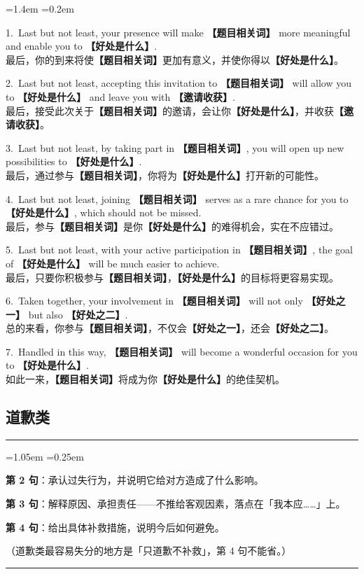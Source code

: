 \documentclass[11pt,a4paper]{ctexart}
\newcommand{\fillin}[1]{{\bfseries【#1】}}
\newenvironment{tpl}[1]{%
  \par\addvspace{7pt}\needspace{4\baselineskip}%
  \noindent{\bfseries\color{accent}#1}\par\nopagebreak
  \vspace{2pt}\noindent\rule{\linewidth}{0.7pt}\par\nopagebreak\vspace{3pt}%
  \begin{list}{}{\leftmargin=1.05em \rightmargin=0.25em \listparindent=0pt
    \itemindent=0pt \topsep=0pt \parsep=2.5pt \itemsep=2.5pt \partopsep=0pt}%
  \item\relax
}{%
  \end{list}\vspace{1pt}\noindent\rule{\linewidth}{0.7pt}\par\addvspace{8pt}%
}
\newenvironment{eg}{%
  \par\addvspace{4pt}%
  \begin{list}{}{\leftmargin=1.4em \rightmargin=0.2em \listparindent=0pt
    \itemindent=0pt \topsep=0pt \parsep=2pt \itemsep=2pt \partopsep=0pt}%
  \item\relax
}{%
  \end{list}\addvspace{5pt}%
}
\begin{document}
\begin{eg}
1.\ Last but not least, your presence will make \fillin{题目相关词} more meaningful and enable you to \fillin{好处是什么}.\\
最后，你的到来将使\fillin{题目相关词}更加有意义，并使你得以\fillin{好处是什么}。

2.\ Last but not least, accepting this invitation to \fillin{题目相关词} will allow you to \fillin{好处是什么} and leave you with \fillin{邀请收获}.\\
最后，接受此次关于\fillin{题目相关词}的邀请，会让你\fillin{好处是什么}，并收获\fillin{邀请收获}。

3.\ Last but not least, by taking part in \fillin{题目相关词}, you will open up new possibilities to \fillin{好处是什么}.\\
最后，通过参与\fillin{题目相关词}，你将为\fillin{好处是什么}打开新的可能性。

4.\ Last but not least, joining \fillin{题目相关词} serves as a rare chance for you to \fillin{好处是什么}, which should not be missed.\\
最后，参与\fillin{题目相关词}是你\fillin{好处是什么}的难得机会，实在不应错过。

5.\ Last but not least, with your active participation in \fillin{题目相关词}, the goal of \fillin{好处是什么} will be much easier to achieve.\\
最后，只要你积极参与\fillin{题目相关词}，\fillin{好处是什么}的目标将更容易实现。

6.\ Taken together, your involvement in \fillin{题目相关词} will not only \fillin{好处之一} but also \fillin{好处之二}.\\
总的来看，你参与\fillin{题目相关词}，不仅会\fillin{好处之一}，还会\fillin{好处之二}。

7.\ Handled in this way, \fillin{题目相关词} will become a wonderful occasion for you to \fillin{好处是什么}.\\
如此一来，\fillin{题目相关词}将成为你\fillin{好处是什么}的绝佳契机。
\end{eg}


\subsection{道歉类}

\begin{tpl}{道歉类 · 第二段骨架}
\textbf{第 2 句}：承认过失行为，并说明它给对方造成了什么影响。\par
\textbf{第 3 句}：解释原因、承担责任——不推给客观因素，落点在「我本应……」上。\par
\textbf{第 4 句}：给出具体补救措施，说明今后如何避免。\par
（道歉类最容易失分的地方是「只道歉不补救」，第 4 句不能省。）
\end{tpl}
\end{document}

